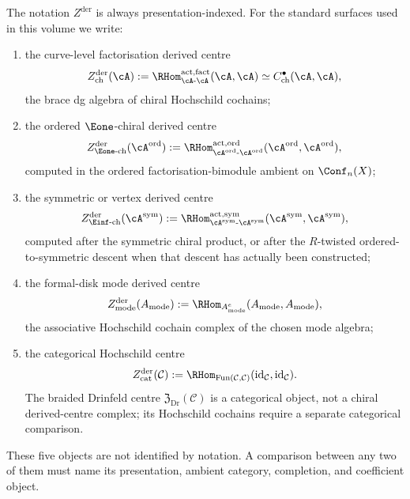 \begin{definition}
\label{def:presentation-indexed-derived-centres}
The notation \(Z^{\mathrm{der}}\) is always presentation-indexed.
For the standard surfaces used in this volume we write:
\begin{enumerate}[label=\textup{(\roman*)}]
\item the curve-level factorisation derived centre
\[
 Z^{\mathrm{der}}_{\mathrm{ch}}(\cA)
 :=
 \RHom_{\cA\text{-}\cA}^{\mathrm{act},\mathrm{fact}}(\cA,\cA)
 \simeq C^\bullet_{\mathrm{ch}}(\cA,\cA),
\]
the brace dg algebra of chiral Hochschild cochains;
\item the ordered \(\Eone\)-chiral derived centre
\[
 Z^{\mathrm{der}}_{\Eone\text{-}\mathrm{ch}}(\cA^{\mathrm{ord}})
 :=
 \RHom_{\cA^{\mathrm{ord}}\text{-}\cA^{\mathrm{ord}}}
 ^{\mathrm{act},\mathrm{ord}}(\cA^{\mathrm{ord}},
 \cA^{\mathrm{ord}}),
\]
computed in the ordered factorisation-bimodule ambient on
\(\Conf_n(X)\);
\item the symmetric or vertex derived centre
\[
 Z^{\mathrm{der}}_{\Einf\text{-}\mathrm{ch}}(\cA^{\mathrm{sym}})
 :=
 \RHom_{\cA^{\mathrm{sym}}\text{-}\cA^{\mathrm{sym}}}
 ^{\mathrm{act},\mathrm{sym}}(\cA^{\mathrm{sym}},
 \cA^{\mathrm{sym}}),
\]
computed after the symmetric chiral product, or after the
\(R\)-twisted ordered-to-symmetric descent when that descent has
actually been constructed;
\item the formal-disk mode derived centre
\[
 Z^{\mathrm{der}}_{\mathrm{mode}}(A_{\mathrm{mode}})
 :=
 \RHom_{A_{\mathrm{mode}}^e}
 (A_{\mathrm{mode}},A_{\mathrm{mode}}),
\]
the associative Hochschild cochain complex of the chosen mode algebra;
\item the categorical Hochschild centre
\[
 Z^{\mathrm{der}}_{\mathrm{cat}}(\mathcal C)
 :=
 \RHom_{\mathrm{Fun}(\mathcal C,\mathcal C)}
 (\mathrm{id}_{\mathcal C},\mathrm{id}_{\mathcal C}).
\]
The braided Drinfeld centre
\(\mathfrak Z_{\mathrm{Dr}}(\mathcal C)\) is a categorical object,
not a chiral derived-centre complex; its Hochschild cochains require
a separate categorical comparison.
\end{enumerate}
These five objects are not identified by notation.  A comparison
between any two of them must name its presentation, ambient category,
completion, and coefficient object.
\end{definition}

